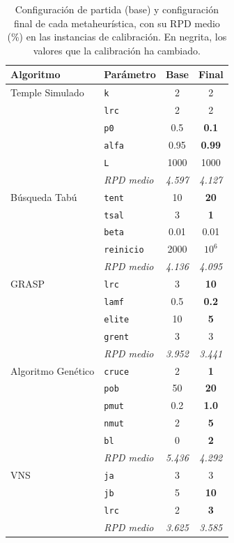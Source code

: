 \begin{table}[H]
\centering
\caption{Configuración de partida (base) y configuración final de cada metaheurística, con su RPD medio (\%) en las instancias de calibración. En negrita, los valores que la calibración ha cambiado.}
\label{tab:config}
\begin{tabular}{@{}llcc@{}}
\toprule
Algoritmo & Parámetro & Base & Final \\ \midrule
Temple Simulado & \texttt{k} & 2 & 2 \\
 & \texttt{lrc} & 2 & 2 \\
 & \texttt{p0} & 0.5 & \textbf{0.1} \\
 & \texttt{alfa} & 0.95 & \textbf{0.99} \\
 & \texttt{L} & 1000 & 1000 \\
 & \emph{RPD medio} & \emph{4.597} & \emph{4.127} \\
\midrule
Búsqueda Tabú & \texttt{tent} & 10 & \textbf{20} \\
 & \texttt{tsal} & 3 & \textbf{1} \\
 & \texttt{beta} & 0.01 & 0.01 \\
 & \texttt{reinicio} & 2000 & \textbf{$10^6$} \\
 & \emph{RPD medio} & \emph{4.136} & \emph{4.095} \\
\midrule
GRASP & \texttt{lrc} & 3 & \textbf{10} \\
 & \texttt{lamf} & 0.5 & \textbf{0.2} \\
 & \texttt{elite} & 10 & \textbf{5} \\
 & \texttt{grent} & 3 & 3 \\
 & \emph{RPD medio} & \emph{3.952} & \emph{3.441} \\
\midrule
Algoritmo Genético & \texttt{cruce} & 2 & \textbf{1} \\
 & \texttt{pob} & 50 & \textbf{20} \\
 & \texttt{pmut} & 0.2 & \textbf{1.0} \\
 & \texttt{nmut} & 2 & \textbf{5} \\
 & \texttt{bl} & 0 & \textbf{2} \\
 & \emph{RPD medio} & \emph{5.436} & \emph{4.292} \\
\midrule
VNS & \texttt{ja} & 3 & 3 \\
 & \texttt{jb} & 5 & \textbf{10} \\
 & \texttt{lrc} & 2 & \textbf{3} \\
 & \emph{RPD medio} & \emph{3.625} & \emph{3.585} \\
\bottomrule
\end{tabular}
\end{table}
